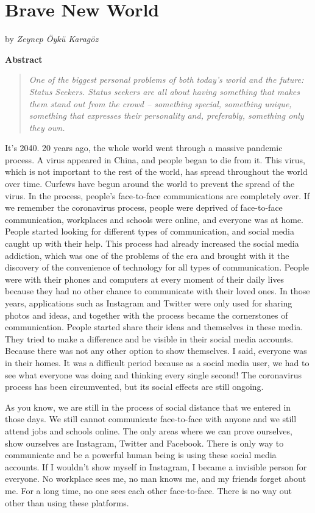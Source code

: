\documentclass[]{book}
\begin{document}
\hypertarget{brave-new-world}{%
\chapter{Brave New World}\label{brave-new-world}}

by \emph{Zeynep Öykü Karagöz}

\textbf{Abstract}

\begin{quote}
\emph{One of the biggest personal problems of both today's world and the future: Status Seekers. Status seekers are all about having something that makes them stand out from the crowd -- something special, something unique, something that expresses their personality and, preferably, something only they own.}
\end{quote}

It's 2040. 20 years ago, the whole world went through a massive pandemic process. A virus appeared in China, and people began to die from it. This virus, which is not important to the rest of the world, has spread throughout the world over time. Curfews have begun around the world to prevent the spread of the virus. In the process, people's face-to-face communications are completely over. If we remember the coronavirus process, people were deprived of face-to-face communication, workplaces and schools were online, and everyone was at home. People started looking for different types of communication, and social media caught up with their help. This process had already increased the social media addiction, which was one of the problems of the era and brought with it the discovery of the convenience of technology for all types of communication. People were with their phones and computers at every moment of their daily lives because they had no other chance to communicate with their loved ones. In those years, applications such as Instagram and Twitter were only used for sharing photos and ideas, and together with the process became the cornerstones of communication. People started share their ideas and themselves in these media. They tried to make a difference and be visible in their social media accounts. Because there was not any other option to show themselves. I said, everyone was in their homes. It was a difficult period because as a social media user, we had to see what everyone was doing and thinking every single second! The coronavirus process has been circumvented, but its social effects are still ongoing.

As you know, we are still in the process of social distance that we entered in those days. We still cannot communicate face-to-face with anyone and we still attend jobs and schools online. The only areas where we can prove ourselves, show ourselves are Instagram, Twitter and Facebook. There is only way to communicate and be a powerful human being is using these social media accounts. If I wouldn't show myself in Instagram, I became a invisible person for everyone. No workplace sees me, no man knows me, and my friends forget about me. For a long time, no one sees each other face-to-face. There is no way out other than using these platforms.
\end{document}
